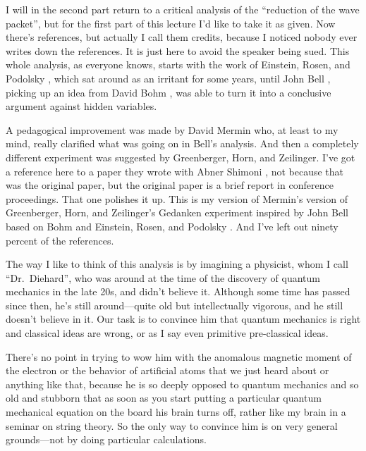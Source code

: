 \documentclass[12pt,nofootinbib]{revtex4}
\begin{document}
I will in the second part return %
to a critical analysis of the ``reduction of the wave packet'', but for the first part of this lecture I'd like to take it as given. Now there's references, but actually I call them credits, because I noticed nobody ever writes down the references. It is just here to avoid the speaker being sued. This whole analysis, as everyone knows, starts with the work of Einstein, Rosen, and Podolsky \cite{einstein-35pr777}, which sat around as an irritant for some years, until John Bell \cite{bell64physics195,bell66rmp447}, picking up an idea from David Bohm \cite{Bohm51}, was able to turn it into a conclusive argument against hidden variables.

A pedagogical improvement was made by David Mermin \cite{mermin85pt38} who, at least to my mind, really clarified what was going on in Bell's analysis. And then a completely different experiment was suggested by Greenberger, Horn, and Zeilinger. I've got a reference here to a paper they wrote with Abner Shimoni \cite{greenberger-90ajp1131}, not because that was the original paper, but the original paper \cite{greenberger-89proc} is a brief report in conference proceedings. That one polishes it up. This is my version of Mermin's version \cite{mermin90ajp731,mermin90pt9} of Greenberger, Horn, and Zeilinger's \cite{greenberger-89proc} Gedanken experiment inspired by John Bell \cite{bell64physics195} based on Bohm \cite{Bohm51} and Einstein, Rosen, and Podolsky \cite{einstein-35pr777}. And I've left out ninety percent of the references.

The way I like to think of this analysis is by imagining a physicist, whom I call ``Dr.\ Diehard'', who was around at the time of the discovery of quantum mechanics in the late 20s, and didn't believe it. Although some time has passed since then, he's still around---quite old but intellectually vigorous, and he still doesn't believe in it. Our task is to convince him that quantum mechanics is right and classical ideas are wrong, or as I say even primitive pre-classical ideas.

There's no point in trying to wow him with the anomalous magnetic moment of the electron or the behavior of artificial atoms that we just heard about or anything like that, because he is so deeply opposed to quantum mechanics and so old and stubborn that as soon as you start putting a particular quantum mechanical equation on the board his brain turns off, rather like my brain in a seminar on string theory. So the only way to convince him is on very general grounds---not by doing particular calculations.
\end{document}
